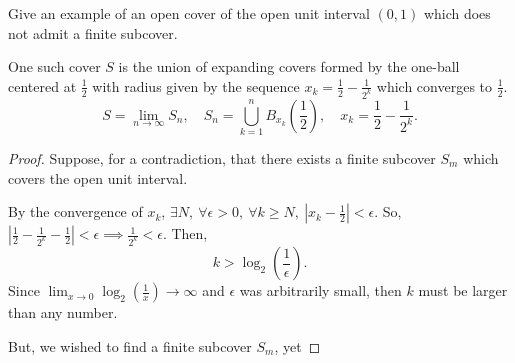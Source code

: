 \documentclass[../hw3]{subfiles}
\begin{document}
\begin{problem}[1]
Give an example of an open cover of the open unit interval $(0,1)$ which does not admit a finite subcover.
\end{problem}
\begin{proposition}
	One such cover $S$ is the union of expanding covers formed by the one-ball centered at $\frac{1}{2}$ with radius given by the sequence $x_k=\frac{1}{2}-\frac{1}{2^k}$ which converges to $\frac{1}{2}$. \[
		S=\lim_{n \to \infty} S_n,\quad S_n= \bigcup^{n}_{k=1}  B_{x_k}\left( \frac{1}{2} \right) ,\quad x_k = \frac{1}{2}-\frac{1}{2^k}
		.\]
\end{proposition}
\begin{proof}
	Suppose, for a contradiction, that there exists a finite subcover $S_m$ which covers the open unit interval.

	By the convergence of $x_k$, $\exists N,\ \forall \epsilon>0,\ \forall k\ge N,\ \left|x_k-\frac{1}{2}\right|<\epsilon$. So, $\left|\frac{1}{2}-\frac{1}{2^k}-\frac{1}{2}\right|<\epsilon\implies \frac{1}{2^k}<\epsilon$. Then,  \[
		k>\log_2\left( \frac{1}{\epsilon} \right)
		.\]
	Since $\lim_{x\to 0}\log_2\left( \frac{1}{x} \right) \to \infty$ and $\epsilon$ was arbitrarily small, then  $k$ must be larger than any number.

	But, we wished to find a finite subcover $S_m$, yet
\end{proof}
\end{document}
